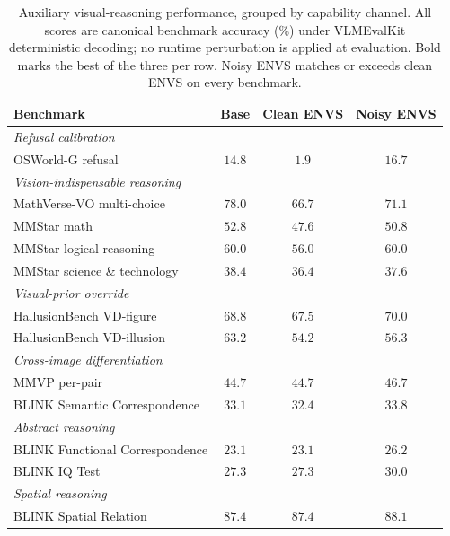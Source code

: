 \documentclass[11pt]{article}
\begin{document}
\begin{table}[H]
  \caption{Auxiliary visual-reasoning performance, grouped by capability
  channel. All scores are canonical benchmark accuracy (\%) under
  VLMEvalKit deterministic decoding; no runtime perturbation is applied
  at evaluation. Bold marks the best of the three per row. Noisy ENVS
  matches or exceeds clean ENVS on every benchmark.}
  \label{tab:aux}
  \centering
  \small
  \begin{tabular}{lccc}
    \toprule
    Benchmark                                 & Base            & Clean ENVS & Noisy ENVS      \\
    \midrule
    \multicolumn{4}{l}{\textit{Refusal calibration}} \\
    \quad OSWorld-G refusal                   & $14.8$          & $1.9$      & $\mathbf{16.7}$ \\
    \midrule
    \multicolumn{4}{l}{\textit{Vision-indispensable reasoning}} \\
    \quad MathVerse-VO multi-choice           & $\mathbf{78.0}$ & $66.7$     & $71.1$          \\
    \quad MMStar math                         & $\mathbf{52.8}$ & $47.6$     & $50.8$          \\
    \quad MMStar logical reasoning            & $\mathbf{60.0}$ & $56.0$     & $\mathbf{60.0}$ \\
    \quad MMStar science \& technology        & $\mathbf{38.4}$ & $36.4$     & $37.6$          \\
    \midrule
    \multicolumn{4}{l}{\textit{Visual-prior override}} \\
    \quad HallusionBench VD-figure            & $68.8$          & $67.5$     & $\mathbf{70.0}$ \\
    \quad HallusionBench VD-illusion          & $\mathbf{63.2}$ & $54.2$     & $56.3$          \\
    \midrule
    \multicolumn{4}{l}{\textit{Cross-image differentiation}} \\
    \quad MMVP per-pair                       & $44.7$          & $44.7$     & $\mathbf{46.7}$ \\
    \quad BLINK Semantic Correspondence       & $33.1$          & $32.4$     & $\mathbf{33.8}$ \\
    \midrule
    \multicolumn{4}{l}{\textit{Abstract reasoning}} \\
    \quad BLINK Functional Correspondence     & $23.1$          & $23.1$     & $\mathbf{26.2}$ \\
    \quad BLINK IQ Test                       & $27.3$          & $27.3$     & $\mathbf{30.0}$ \\
    \midrule
    \multicolumn{4}{l}{\textit{Spatial reasoning}} \\
    \quad BLINK Spatial Relation              & $87.4$          & $87.4$     & $\mathbf{88.1}$ \\
    \bottomrule
  \end{tabular}
\end{table}
\end{document}
